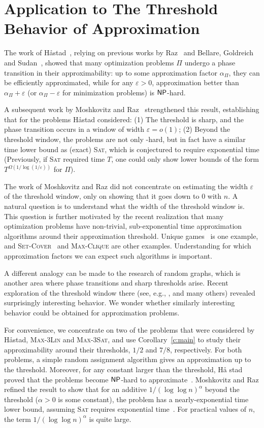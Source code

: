 \section{Application to The Threshold Behavior of Approximation}

The work of H\aa stad~\cite{Has97}, relying on previous works by Raz~\cite{Raz} and Bellare, Goldreich and Sudan~\cite{BGS}, showed that many optimization problems $\Pi$ undergo a phase transition in their approximability: up to some approximation factor $\alpha_{\Pi}$, they can be efficiently approximated, while for any $\varepsilon > 0$, approximation better than $\alpha_{\Pi} + \varepsilon$ (or $\alpha_{\Pi}-\varepsilon$ for minimization problems) is ${\sf {\sf NP}}$-hard.

A subsequent work by Moshkovitz and Raz~\cite{MR08} strengthened this result, establishing that for the problems H\aa stad considered: (1) The threshold is sharp, and the phase transition occurs in a window of width $\varepsilon = o(1)$; (2) Beyond the threshold window, the problems are not only {}-hard, but in fact have a similar time lower bound as (exact) \textsc{Sat}, which is conjectured to require exponential time (Previously, if \textsc{Sat} required time $T$, one could only show lower bounds of the form $T^{\Omega(1/\log(1/\varepsilon))}$ for $\Pi$).

The work of Moshkovitz and Raz did not concentrate on estimating the width $\varepsilon$ of the threshold window, only on showing that it goes down to $0$ with $n$. A natural question is to understand what the width of the threshold window is. This question is further motivated by the recent realization that many optimization problems have non-trivial, sub-exponential time approximation algorithms around their approximation threshold. Unique games~\cite{ABS} is one example, and \textsc{Set-Cover}~\cite{CKW} and \textsc{Max-Clique} are other examples. Understanding for which approximation factors we can expect such algorithms is important.

A different analogy can be made to the research of random graphs, which is another area where phase transitions and sharp thresholds arise. Recent exploration of the threshold window there (see, e.g., \cite{BBCKW}, and many others) revealed surprisingly interesting behavior.
We wonder whether similarly interesting behavior could be obtained for approximation problems.

For convenience, we concentrate on two of the problems that were considered by H\aa stad,
\textsc{Max-3Lin} and \textsc{Max-3Sat}, and use Corollary~\ref{c:main} to study their approximability around their thresholds,
${1}/{2}$ and ${7}/{8}$, respectively.  For both problems, a simple
random assignment algorithm gives an approximation up to the
threshold. Moreover, for any constant larger than the threshold, H\aa
stad proved that the problems become ${\sf {\sf NP}}$-hard to
approximate~\cite{Has97}. Moshkovitz and Raz refined the result to
show that for an additive $1/(\log\log n)^{\alpha}$ beyond the
threshold ($\alpha>0$ is some constant), the problem has a
nearly-exponential time lower bound, assuming \textsc{Sat} requires
exponential time~\cite{MR08}. For practical values of $n$, the term $1/(\log\log n)^{\alpha}$ is quite large.

